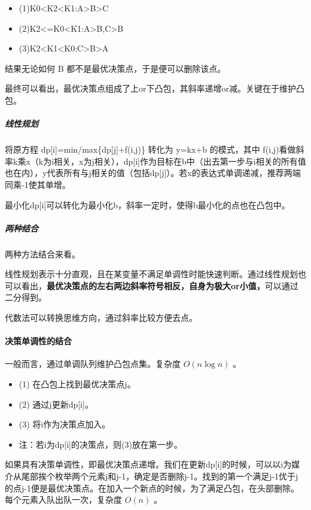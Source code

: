 \documentclass[a4paper,11pt]{article}
\begin{document}
\begin{itemize}
  \item (1)K0<K2<K1:A>B>C
  \item (2)K2<=K0<K1:A>B,C>B
  \item (3)K2<K1<K0:C>B>A
\end{itemize}

结果无论如何 B 都不是最优决策点，于是便可以删除该点。

最终可以看出，最优决策点组成了上or下凸包，其斜率递增or减。关键在于维护凸包。

\subparagraph{线性规划}

将原方程 dp[i]=min/max\{dp[j]+f(i,j)\} 转化为 y=kx+b 的模式，其中 f(i,j)看做斜率k乘x（k为i相关，x为j相关），dp[i]作为目标在b中（出去第一步与i相关的所有值也在内），y代表所有与j相关的值（包括dp[j]）。若x的表达式单调递减，推荐两端同乘-1使其单增。

最小化dp[i]可以转化为最小化b，斜率一定时，使得b最小化的点也在凸包中。

\subparagraph{两种结合}
两种方法结合来看。

线性规划表示十分直观，且在某变量不满足单调性时能快速判断。通过线性规划也可以看出，\textbf{最优决策点的左右两边斜率符号相反，自身为极大or小值，}可以通过二分得到。

代数法可以转换思维方向，通过斜率比较方便去点。

\paragraph{决策单调性的结合}
一般而言，通过单调队列维护凸包点集。复杂度 \(O(n\log n)\) 。
\begin{itemize}
  \item (1) 在凸包上找到最优决策点j。
  \item (2) 通过j更新dp[i]。
  \item (3) 将i作为决策点加入。
  \item 注：若i为dp[i]的决策点，则(3)放在第一步。
\end{itemize}

如果具有决策单调性，即最优决策点递增。我们在更新dp[i]的时候，可以以i为媒介从尾部挨个枚举两个元素j和j-1，确定是否删除j-1。找到的第一个满足j-1优于j的点j-1便是最优决策点。在加入一个新点的时候，为了满足凸包，在头部删除。每个元素入队出队一次，复杂度 \(O(n)\) 。
\end{document}
